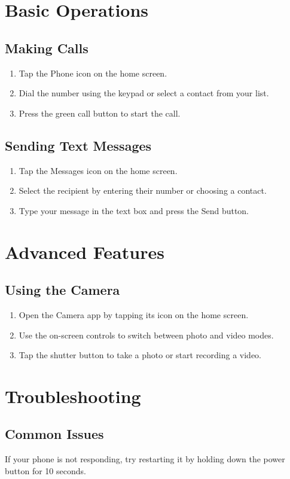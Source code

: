\documentclass{article}
\begin{document}
\section{Basic Operations}
\subsection{Making Calls}
\begin{enumerate}
    \item Tap the Phone icon on the home screen.
    \item Dial the number using the keypad or select a contact from your list.
    \item Press the green call button to start the call.
\end{enumerate}

\subsection{Sending Text Messages}
\begin{enumerate}
    \item Tap the Messages icon on the home screen.
    \item Select the recipient by entering their number or choosing a contact.
    \item Type your message in the text box and press the Send button.
\end{enumerate}

\section{Advanced Features}
\subsection{Using the Camera}
\begin{enumerate}
    \item Open the Camera app by tapping its icon on the home screen.
    \item Use the on-screen controls to switch between photo and video modes.
    \item Tap the shutter button to take a photo or start recording a video.
\end{enumerate}

\section{Troubleshooting}
\subsection{Common Issues}
If your phone is not responding, try restarting it by holding down the power button for 10 seconds.
\end{document}
